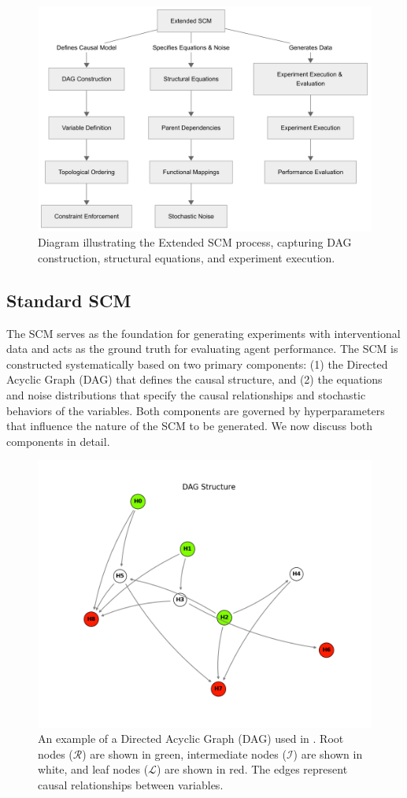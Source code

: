 \documentclass{uai2024} %
\begin{document}
        \begin{figure}[ht]
            \centering
            \includegraphics[width=0.7\columnwidth]{assets/scm_generation.png} %
            \caption{Diagram illustrating the Extended SCM process, capturing DAG construction, structural equations, and experiment execution.}
            \label{fig:scm_generation}
        \end{figure}



    \subsection{Standard SCM}
        The SCM serves as the foundation for generating experiments with interventional data and acts as the ground truth for evaluating agent performance. 
        The SCM is constructed systematically based on two primary components: 
        (1) the Directed Acyclic Graph (DAG) that defines the causal structure, and 
        (2) the equations and noise distributions that specify the causal relationships and stochastic behaviors of the variables.
        Both components are governed by hyperparameters that influence the nature of the SCM to be generated.
        We now discuss both components in detail.

        \begin{figure}[ht]
            \centering
            \includegraphics[width=0.7\columnwidth]{assets/dag_example.png} %
            \caption{An example of a Directed Acyclic Graph (DAG) used in \game. Root nodes ($\mathcal{R}$) are shown in green, intermediate nodes ($\mathcal{I}$) are shown in white, and leaf nodes ($\mathcal{L}$) are shown in red. The edges represent causal relationships between variables.}
            \label{fig:dag_example}
        \end{figure}
\end{document}
